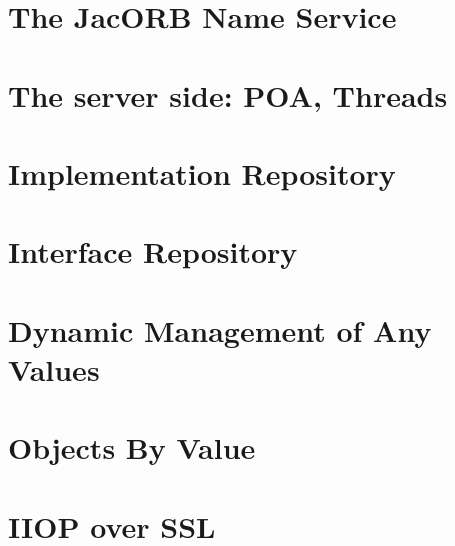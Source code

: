 \documentclass[12pt]{scrbook}
\begin{document}
\chapter{The JacORB Name Service}
\label{ch:naming}




\chapter{The server side: POA, Threads}
\label{ch:POA}




\chapter{Implementation Repository}
\label{Ch_Imr}



\chapter{Interface Repository}
\label{ch:interface_repository}




\chapter{Dynamic Management of Any Values}
\label{ch:dynany}



\chapter{Objects By Value}
\label{ch:obv}




\chapter{IIOP over SSL}
\label{ch:SSL}
\end{document}
